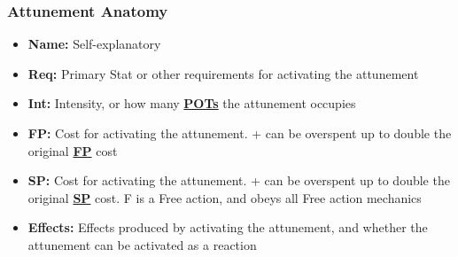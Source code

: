 \documentclass[12pt]{article}
\newcommand{\refto}[1]{\hyperlink{#1}{\textbf{#1}}}
\begin{document}
\subsubsection*{Attunement Anatomy}
\begin{itemize}
\item \textbf{Name:} Self-explanatory
\item \textbf{Req:} Primary Stat or other requirements for activating the attunement
\item \textbf{Int:} Intensity, or how many \refto{POTs} the attunement occupies 
\item \textbf{FP:} Cost for activating the attunement. + can be overspent up to double the original \refto{FP} cost
\item \textbf{SP:} Cost for activating the attunement. + can be overspent up to double the original \refto{SP} cost. F is a Free action, and obeys all Free action mechanics
\item \textbf{Effects:} Effects produced by activating the attunement, and whether the attunement can be activated as a reaction
\end{itemize}
\end{document}
